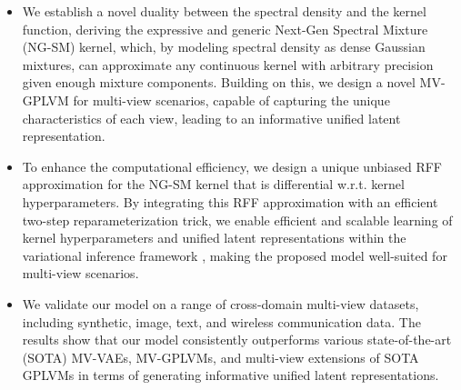 \begin{itemize}
    \item We establish a novel duality between the spectral density and the kernel function, deriving the expressive and generic \MakeUppercase{n}ext-\MakeUppercase{g}en \MakeUppercase{s}pectral \MakeUppercase{m}ixture (NG-SM) kernel, which, by modeling spectral density as dense Gaussian mixtures, can approximate any continuous kernel with arbitrary precision given enough mixture components. Building on this, we design a novel MV-GPLVM for multi-view scenarios, capable of capturing the unique characteristics of each view, leading to an informative unified latent representation.  
    \vspace{-0.02in}
    \item To enhance the computational efficiency, we design a unique unbiased RFF approximation for the NG-SM kernel that is differential w.r.t. kernel hyperparameters. By integrating this RFF approximation with an efficient two-step reparameterization  trick,  we enable efficient and scalable learning of kernel hyperparameters and unified latent representations within the variational inference framework \citep{kingma2013auto}, making the proposed model well-suited for multi-view scenarios. 
    \vspace{-0.02in}
    \item We validate our model on a range of cross-domain multi-view datasets, including synthetic, image, text, and wireless communication data. The results show that our model consistently outperforms various state-of-the-art (\MakeUppercase{sota}) MV-VAEs, MV-GPLVMs, and multi-view extensions of \MakeUppercase{sota} GPLVMs in terms of generating informative unified latent representations. 
\end{itemize}
